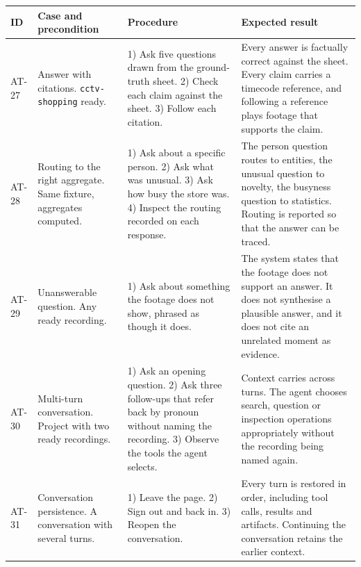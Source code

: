 \begin{table}[htbp]
\centering
\footnotesize
\begin{tabularx}{\textwidth}{@{}L{0.9cm}L{3.2cm}XX@{}}
\toprule
\textbf{ID} & \textbf{Case and precondition} & \textbf{Procedure} & \textbf{Expected result} \\
\midrule

AT-27 & Answer with citations. \texttt{cctv-shopping} ready. &
1) Ask five questions drawn from the ground-truth sheet. 2) Check each claim against the
sheet. 3) Follow each citation. &
Every answer is factually correct against the sheet. Every claim carries a timecode
reference, and following a reference plays footage that supports the claim. \\

AT-28 & Routing to the right aggregate. Same fixture, aggregates computed. &
1) Ask about a specific person. 2) Ask what was unusual. 3) Ask how busy the store was.
4) Inspect the routing recorded on each response. &
The person question routes to entities, the unusual question to novelty, the busyness
question to statistics. Routing is reported so that the answer can be traced. \\

AT-29 & Unanswerable question. Any ready recording. &
1) Ask about something the footage does not show, phrased as though it does. &
The system states that the footage does not support an answer. It does not synthesise a
plausible answer, and it does not cite an unrelated moment as evidence. \\

AT-30 & Multi-turn conversation. Project with two ready recordings. &
1) Ask an opening question. 2) Ask three follow-ups that refer back by pronoun without
naming the recording. 3) Observe the tools the agent selects. &
Context carries across turns. The agent chooses search, question or inspection
operations appropriately without the recording being named again. \\

AT-31 & Conversation persistence. A conversation with several turns. &
1) Leave the page. 2) Sign out and back in. 3) Reopen the conversation. &
Every turn is restored in order, including tool calls, results and artifacts. Continuing
the conversation retains the earlier context. \\

\bottomrule
\end{tabularx}
\end{table}

